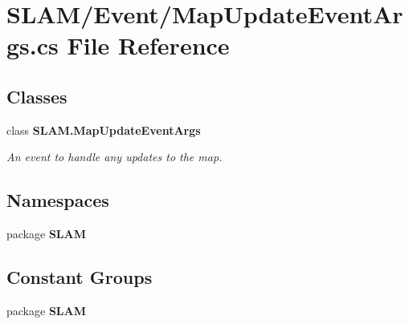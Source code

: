 \section{S\-L\-A\-M/\-Event/\-Map\-Update\-Event\-Args.cs File Reference}
\label{_map_update_event_args_8cs}
\subsection*{Classes}
\begin{DoxyCompactItemize}
\item 
class {\bf S\-L\-A\-M.\-Map\-Update\-Event\-Args}
\begin{DoxyCompactList}\small\item\em An event to handle any updates to the map. \end{DoxyCompactList}\end{DoxyCompactItemize}
\subsection*{Namespaces}
\begin{DoxyCompactItemize}
\item 
package {\bf S\-L\-A\-M}
\end{DoxyCompactItemize}
\subsection*{Constant Groups}
\begin{DoxyCompactItemize}
\item 
package {\bf S\-L\-A\-M}
\end{DoxyCompactItemize}
